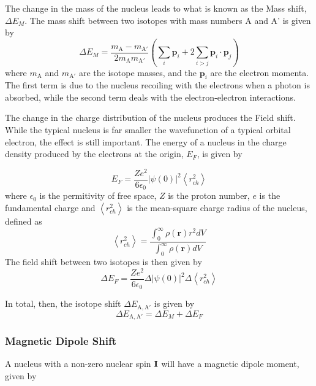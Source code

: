 The change in the mass of the nucleus leads to what is known as the Mass shift, $\Delta E_M$. The mass shift between two isotopes with mass numbers A and A' is given by
\begin{equation}
\Delta E_M = \frac{m_{\mathrm{A}}-m_{\mathrm{A'}}}{2 m_{\mathrm{A}} m_{\mathrm{A'}}} \left(\sum_i\mathrm{\textbf{p}}_i +2 \sum_{i>j}\mathrm{\textbf{p}}_i \cdot \mathrm{\textbf{p}}_j \right)
\end{equation}
where $m_{\mathrm{A}}$ and $m_{\mathrm{A'}}$ are the isotope masses, and the $\textbf{p}_i$ are the electron momenta. The first term is due to the nucleus recoiling with the electrons when a photon is absorbed, while the second term deals with the electron-electron interactions.  

The change in the charge distribution of the nucleus produces the Field shift. While the typical nucleus is far smaller the wavefunction of a typical orbital electron, the effect is still important. The energy of a nucleus in the charge density produced by the electrons at the origin, $E_F$, is given by

\begin{equation}
E_F = \frac{Ze^2}{6 \epsilon_0}|\psi(0)|^2 \left\langle r_{ch}^2\right\rangle
\end{equation}
where $\epsilon_0$ is the permitivity of free space, $Z$ is the proton number, $e$ is the fundamental charge and $ \left\langle r_{ch}^2\right\rangle$ is the mean-square charge radius of the nucleus, defined as
\begin{equation}
 \left\langle r_{ch}^2\right\rangle = \frac{\int_0^{\infty}\rho(\mathbf{r})r^2dV}{\int_0^{\infty}\rho(\mathbf{r})dV}
\end{equation}
The field shift between two isotopes is then given by
\begin{equation}
\Delta E_F =  \frac{Ze^2}{6 \epsilon_0}\Delta|\psi(0)|^2 \Delta\left\langle r_{ch}^2\right\rangle
\end{equation}

In total, then, the isotope shift $\Delta E_{\mathrm{A,A}'}$ is given by
\begin{equation}
 \Delta E_{\mathrm{A,A'}} = \Delta E_M + \Delta E_F
\end{equation}
\subsubsection*{Magnetic Dipole Shift}
A nucleus with a non-zero nuclear spin $\bf{I}$  will have a magnetic dipole moment, given by


